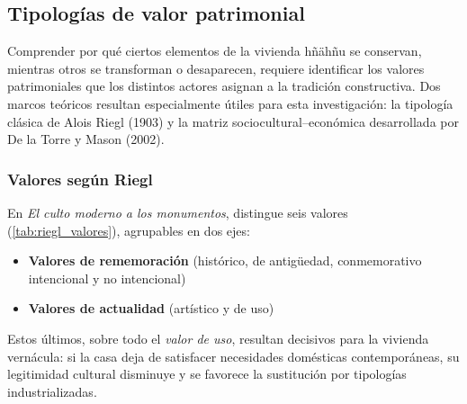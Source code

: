 \subsection{Tipologías de valor patrimonial}
\label{subsec:tipologias_valor}

Comprender por qué ciertos elementos de la vivienda hñähñu se conservan,
mientras otros se transforman o desaparecen, requiere identificar los
valores patrimoniales que los distintos actores asignan a la
tradición constructiva.  Dos marcos teóricos resultan especialmente
útiles para esta investigación: la tipología clásica de Alois Riegl
(1903) y la matriz sociocultural–económica desarrollada por De la Torre
y Mason (2002).

\subsubsection{Valores según Riegl}

En \textit{El culto moderno a los monumentos}, \citeauthor{riegl1903} distingue seis valores
(\autoref{tab:riegl_valores}), agrupables en dos ejes:

\begin{itemize}
	\item \textbf{Valores de rememoración} (histórico, de antigüedad,
	      conmemorativo intencional y no intencional)
	\item \textbf{Valores de actualidad} (artístico y de uso)
\end{itemize}

Estos últimos, sobre todo el \emph{valor de uso}, resultan decisivos
para la vivienda vernácula: si la casa deja de satisfacer necesidades
domésticas contemporáneas, su legitimidad cultural disminuye y se
favorece la sustitución por tipologías industrializadas.

